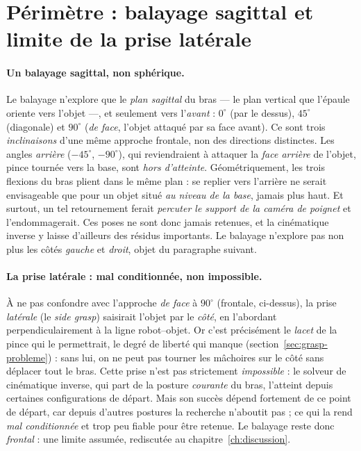 \section{Périmètre : balayage sagittal et limite de la prise latérale}
\label{sec:grasp-perimetre}

\paragraph{Un balayage sagittal, non sphérique.} Le balayage n'explore que le \emph{plan sagittal} du bras --- le plan vertical que l'épaule oriente vers l'objet ---, et seulement vers l'\emph{avant} : $0^{\circ}$ (par le dessus), $45^{\circ}$ (diagonale) et $90^{\circ}$ (\emph{de face}, l'objet attaqué par sa face avant). Ce sont trois \emph{inclinaisons} d'une même approche frontale, non des directions distinctes. Les angles \emph{arrière} ($-45^{\circ}$, $-90^{\circ}$), qui reviendraient à attaquer la \emph{face arrière} de l'objet, pince tournée vers la base, sont \emph{hors d'atteinte}. Géométriquement, les trois flexions du bras plient dans le même plan : se replier vers l'arrière ne serait envisageable que pour un objet situé \emph{au niveau de la base}, jamais plus haut. Et surtout, un tel retournement ferait \emph{percuter le support de la caméra de poignet} et l'endommagerait. Ces poses ne sont donc jamais retenues, et la cinématique inverse y laisse d'ailleurs des résidus importants. Le balayage n'explore pas non plus les côtés \emph{gauche} et \emph{droit}, objet du paragraphe suivant.

\paragraph{La prise latérale : mal conditionnée, non impossible.} À ne pas confondre avec l'approche \emph{de face} à $90^{\circ}$ (frontale, ci-dessus), la prise \emph{latérale} (le \emph{side grasp}) saisirait l'objet par le \emph{côté}, en l'abordant perpendiculairement à la ligne robot--objet. Or c'est précisément le \emph{lacet} de la pince qui le permettrait, le degré de liberté qui manque (section~\ref{sec:grasp-probleme}) : sans lui, on ne peut pas tourner les mâchoires sur le côté sans déplacer tout le bras. Cette prise n'est pas strictement \emph{impossible} : le solveur de cinématique inverse, qui part de la posture \emph{courante} du bras, l'atteint depuis certaines configurations de départ. Mais son succès dépend fortement de ce point de départ, car depuis d'autres postures la recherche n'aboutit pas ; ce qui la rend \emph{mal conditionnée} et trop peu fiable pour être retenue. Le balayage reste donc \emph{frontal} : une limite assumée, rediscutée au chapitre~\ref{ch:discussion}.

